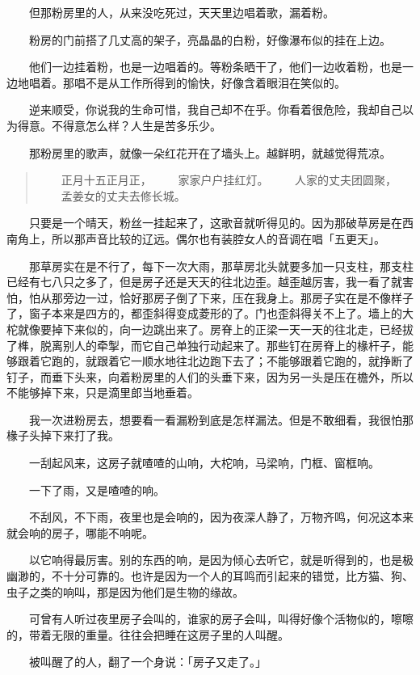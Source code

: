 \documentclass[UTF8]{ctexart}
\begin{document}
　　但那粉房里的人，从来没吃死过，天天里边唱着歌，漏着粉。

　　粉房的门前搭了几丈高的架子，亮晶晶的白粉，好像瀑布似的挂在上边。

　　他们一边挂着粉，也是一边唱着的。等粉条晒干了，他们一边收着粉，也是一边地唱着。那唱不是从工作所得到的愉快，好像含着眼泪在笑似的。

　　逆来顺受，你说我的生命可惜，我自己却不在乎。你看着很危险，我却自己以为得意。不得意怎么样？人生是苦多乐少。

　　那粉房里的歌声，就像一朵红花开在了墙头上。越鲜明，就越觉得荒凉。

\begin{verse}
    　　正月十五正月正，
    　　家家户户挂红灯。
    　　人家的丈夫团圆聚，
    　　孟姜女的丈夫去修长城。
\end{verse}

　　只要是一个晴天，粉丝一挂起来了，这歌音就听得见的。因为那破草房是在西南角上，所以那声音比较的辽远。偶尔也有装腔女人的音调在唱「五更天」。

　　那草房实在是不行了，每下一次大雨，那草房北头就要多加一只支柱，那支柱已经有七八只之多了，但是房子还是天天的往北边歪。越歪越厉害，我一看了就害怕，怕从那旁边一过，恰好那房子倒了下来，压在我身上。那房子实在是不像样子了，窗子本来是四方的，都歪斜得变成菱形的了。门也歪斜得关不上了。墙上的大柁就像要掉下来似的，向一边跳出来了。房脊上的正梁一天一天的往北走，已经拔了榫，脱离别人的牵掣，而它自己单独行动起来了。那些钉在房脊上的椽杆子，能够跟着它跑的，就跟着它一顺水地往北边跑下去了；不能够跟着它跑的，就挣断了钉子，而垂下头来，向着粉房里的人们的头垂下来，因为另一头是压在檐外，所以不能够掉下来，只是滴里郎当地垂着。

　　我一次进粉房去，想要看一看漏粉到底是怎样漏法。但是不敢细看，我很怕那椽子头掉下来打了我。

　　一刮起风来，这房子就喳喳的山响，大柁响，马梁响，门框、窗框响。

　　一下了雨，又是喳喳的响。

　　不刮风，不下雨，夜里也是会响的，因为夜深人静了，万物齐鸣，何况这本来就会响的房子，哪能不响呢。

　　以它响得最厉害。别的东西的响，是因为倾心去听它，就是听得到的，也是极幽渺的，不十分可靠的。也许是因为一个人的耳鸣而引起来的错觉，比方猫、狗、虫子之类的响叫，那是因为他们是生物的缘故。

　　可曾有人听过夜里房子会叫的，谁家的房子会叫，叫得好像个活物似的，嚓嚓的，带着无限的重量。往往会把睡在这房子里的人叫醒。

　　被叫醒了的人，翻了一个身说：「房子又走了。」
\end{document}
